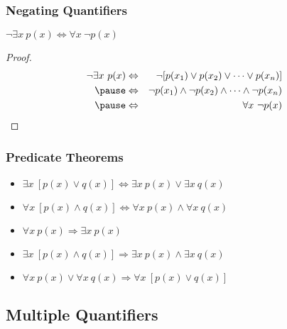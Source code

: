 \documentclass[dvipsnames]{beamer}
\begin{document}
\begin{frame}
  \frametitle{Negating Quantifiers}

  \begin{theorem}
    $\neg \exists x~p(x) \Leftrightarrow \forall x~\neg p(x)$
  \end{theorem}

  \pause
  \begin{proof}
    \begin{eqnarray*}
      \neg \exists x~p(x) & \Leftrightarrow & \neg [p(x_1) \vee p(x_2) \vee \cdots
                                              \vee p(x_n)]\\\pause
                          & \Leftrightarrow & \neg p(x_1) \wedge \neg p(x_2) \wedge \cdots
                                              \wedge \neg p(x_n)\\\pause
                          & \Leftrightarrow & \forall x~\neg p(x)
    \end{eqnarray*}
  \end{proof}
\end{frame}

\begin{frame}
  \frametitle{Predicate Theorems}

  \begin{itemize}
    \item $\exists x~[p(x) \vee q(x)]
      \Leftrightarrow \exists x~p(x) \vee \exists x~q(x)$

    \pause
    \medskip
    \item $\forall x~[p(x) \wedge q(x)]
      \Leftrightarrow \forall x~p(x) \wedge \forall x~q(x)$

    \pause
    \bigskip
    \item $\forall x~p(x) \Rightarrow \exists x~p(x)$

    \pause
    \bigskip
    \item $\exists x~[p(x) \wedge q(x)]
      \Rightarrow \exists x~p(x) \wedge \exists x~q(x)$

    \pause
    \medskip
    \item $\forall x~p(x) \vee \forall x~q(x)
      \Rightarrow \forall x~[p(x) \vee q(x)]$
  \end{itemize}
\end{frame}

\subsection{Multiple Quantifiers}
\end{document}
